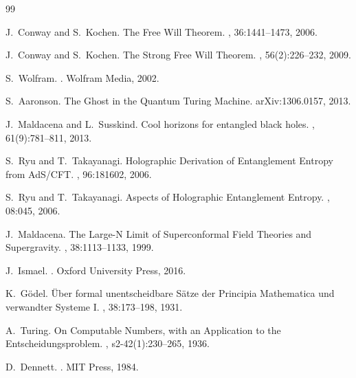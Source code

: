 \documentclass[12pt,a4paper]{article}
\theoremstyle{definition}
\theoremstyle{remark}
\begin{document}

\begin{thebibliography}{99}

J.~Conway and S.~Kochen.
\newblock The Free Will Theorem.
, 36:1441--1473, 2006.

J.~Conway and S.~Kochen.
\newblock The Strong Free Will Theorem.
, 56(2):226--232, 2009.

S.~Wolfram.
.
\newblock Wolfram Media, 2002.

S.~Aaronson.
\newblock The Ghost in the Quantum Turing Machine.
\newblock arXiv:1306.0157, 2013.

J.~Maldacena and L.~Susskind.
\newblock Cool horizons for entangled black holes.
, 61(9):781--811, 2013.

S.~Ryu and T.~Takayanagi.
\newblock Holographic Derivation of Entanglement Entropy from AdS/CFT.
, 96:181602, 2006.

S.~Ryu and T.~Takayanagi.
\newblock Aspects of Holographic Entanglement Entropy.
, 08:045, 2006.

J.~Maldacena.
\newblock The Large-N Limit of Superconformal Field Theories and Supergravity.
, 38:1113--1133, 1999.

J.~Ismael.
.
\newblock Oxford University Press, 2016.

K.~G\"odel.
\newblock \"Uber formal unentscheidbare S\"atze der Principia Mathematica und
  verwandter Systeme I.
, 38:173--198, 1931.

A.~Turing.
\newblock On Computable Numbers, with an Application to the
  Entscheidungsproblem.
,
  s2-42(1):230--265, 1936.

D.~Dennett.
.
\newblock MIT Press, 1984.


\end{thebibliography}
\end{document}
